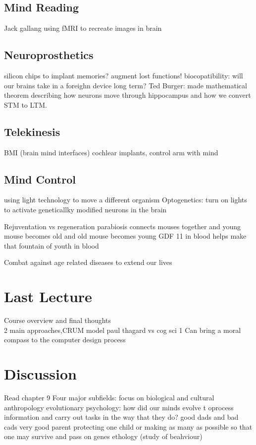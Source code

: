 \documentclass{article}
\begin{document}
\subsection{Mind Reading}
Jack gallang using fMRI to recreate images in brain

\subsection{Neuroprosthetics}
silicon chips to implant memories? augment lost functions!
biocopatibility: will our brains take in a foreighn device long term?
Ted Burger: made mathematical theorem describing how neurons move through hippocampus and how we convert STM to LTM. 

\subsection{Telekinesis}
BMI (brain mind interfaces) 
cochlear implants, control arm with mind 

\subsection{Mind Control}
using light technology to move a different organism 
Optogenetics: turn on lights to activate geneticallky modified neurons in the brain

Rejuventation vs regeneration
parabiosis
connects mouses together and young mouse becomes old and old mouse becomes young
GDF 11 in blood helps make that
fountain of youth in blood

Combat against age related diseases to extend our lives

\section{Last Lecture}
Course overview and final thoughts \\ 

2 main approaches,CRUM model paul thagard vs cog sci 1
Can bring a moral compass to the computer design process

\section{Discussion}

Read chapter 9 
Four major subfields: focus on biological and cultural anthropology
evolutionary psychology: how did our minds evolve t oprocess information and carry out tasks in the way that they do? 
good dads and bad cads
very good parent protecting one child
or making as many as possible so that one may  survive and pass on genes
ethology (study of beahviour) 
\end{document}
